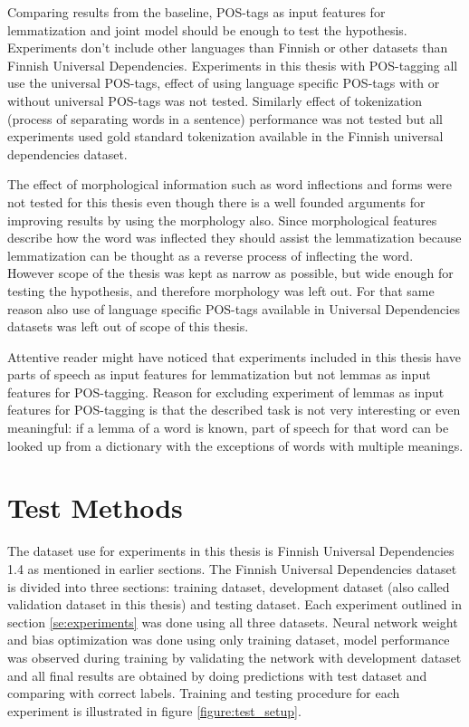 \documentclass[12pt,a4paper,english
]{tutthesis}
\begin{document}
Comparing results from the baseline, POS-tags as input features for lemmatization and joint model should be enough to test the hypothesis. Experiments don't include other languages than Finnish or other datasets than Finnish Universal Dependencies. Experiments in this thesis with POS-tagging all use the universal POS-tags, effect of using language specific POS-tags with or without universal POS-tags was not tested. Similarly effect of tokenization (process of separating words in a sentence) performance was not tested but all experiments used gold standard tokenization available in the Finnish universal dependencies dataset.

The effect of morphological information such as word inflections and forms were not tested for this thesis even though there is a well founded arguments for improving results by using the morphology also. Since morphological features describe how the word was inflected they should assist the lemmatization because lemmatization can be thought as a reverse process of inflecting the word. However scope of the thesis was kept as narrow as possible, but wide enough for testing the hypothesis, and therefore morphology was left out. For that same reason also use of language specific POS-tags available in Universal Dependencies datasets was left out of scope of this thesis. 

Attentive reader might have noticed that experiments included in this thesis have parts of speech as input features for lemmatization but not lemmas as input features for POS-tagging. Reason for excluding experiment of lemmas as input features for POS-tagging is that the described task is not very interesting or even meaningful: if a lemma of a word is known, part of speech for that word can be looked up from a dictionary with the exceptions of words with multiple meanings.


\section{Test Methods}
\label{se:test_methods}
The dataset use for experiments in this thesis is Finnish Universal Dependencies 1.4 as mentioned in earlier sections. The Finnish Universal Dependencies dataset is divided into three sections: training dataset, development dataset (also called validation dataset in this thesis) and testing dataset. Each experiment outlined in section \ref{se:experiments} was done using all three datasets. Neural network weight and bias optimization was done using only training dataset, model performance was observed during training by validating the network with development dataset and all final results are obtained by doing predictions with test dataset and comparing with correct labels. Training and testing procedure for each experiment is illustrated in figure \ref{figure:test_setup}.
\end{document}
